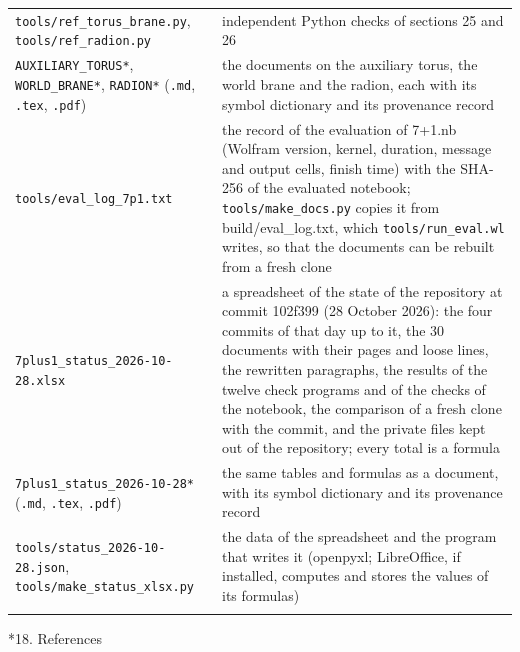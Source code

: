 \documentclass[10pt,a4paper]{article}
\makeatletter
\renewcommand\section{\@startsection{section}{1}{\z@}{-3.5ex \@plus -1ex \@minus -.2ex}{2.3ex \@plus.2ex}{\normalfont\Large\bfseries\raggedright}}
\makeatother
\begin{document}
{\begin{longtable}{>{\raggedright\arraybackslash}p{}>{\raggedright\arraybackslash}p{}}
\texttt{tools/\allowbreak{}ref\_\allowbreak{}torus\_\allowbreak{}brane.py}, \texttt{tools/\allowbreak{}ref\_\allowbreak{}radion.py} & independent Python checks of sections 25 and 26 \\
\texttt{AUXILIARY\_\allowbreak{}TORUS*}, \texttt{WORLD\_\allowbreak{}BRANE*}, \texttt{RADION*} (\texttt{.md}, \texttt{.tex}, \texttt{.pdf}) & the documents on the auxiliary torus, the world brane and the radion, each with its symbol dictionary and its provenance record \\
\texttt{tools/\allowbreak{}eval\_\allowbreak{}log\_\allowbreak{}7p1.txt} & the record of the evaluation of 7+1.nb (Wolfram version, kernel, duration, message and output cells, finish time) with the SHA-256 of the evaluated notebook; \texttt{tools/\allowbreak{}make\_\allowbreak{}docs.py} copies it from build/eval\_log.txt, which \texttt{tools/\allowbreak{}run\_\allowbreak{}eval.wl} writes, so that the documents can be rebuilt from a fresh clone \\
\texttt{7plus1\_\allowbreak{}status\_\allowbreak{}2026-10-28.xlsx} & a spreadsheet of the state of the repository at commit 102f399 (28 October 2026): the four commits of that day up to it, the 30 documents with their pages and loose lines, the rewritten paragraphs, the results of the twelve check programs and of the checks of the notebook, the comparison of a fresh clone with the commit, and the private files kept out of the repository; every total is a formula \\
\texttt{7plus1\_\allowbreak{}status\_\allowbreak{}2026-10-28*} (\texttt{.md}, \texttt{.tex}, \texttt{.pdf}) & the same tables and formulas as a document, with its symbol dictionary and its provenance record \\
\texttt{tools/\allowbreak{}status\_\allowbreak{}2026-10-28.json}, \texttt{tools/\allowbreak{}make\_\allowbreak{}status\_\allowbreak{}xlsx.py} & the data of the spreadsheet and the program that writes it (openpyxl; LibreOffice, if installed, computes and stores the values of its formulas) \\*
\end{longtable}}
\section*{18. References}
\end{document}
